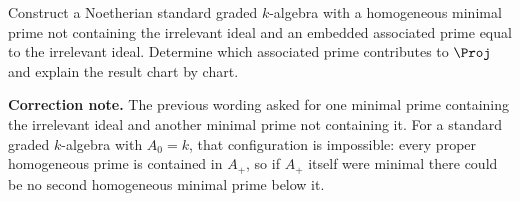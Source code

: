 \begin{problem}\label{chal:vi37-05}
Construct a Noetherian standard graded \(k\)-algebra with a homogeneous minimal prime not containing the irrelevant ideal and an embedded associated prime equal to the irrelevant ideal. Determine which associated prime contributes to \(\Proj\) and explain the result chart by chart.

\textbf{Correction note.} The previous wording asked for one minimal prime containing the irrelevant ideal and another minimal prime not containing it. For a standard graded \(k\)-algebra with \(A_0=k\), that configuration is impossible: every proper homogeneous prime is contained in \(A_+\), so if \(A_+\) itself were minimal there could be no second homogeneous minimal prime below it.
\end{problem}

